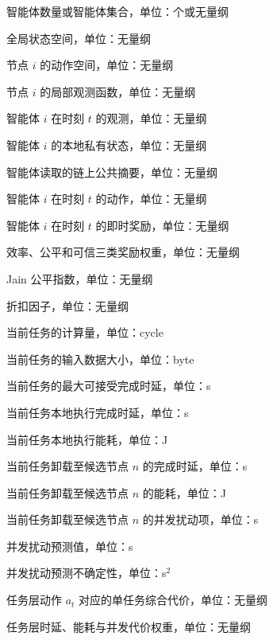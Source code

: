 \begin{symbols}
  \item[$N$] 智能体数量或智能体集合，单位：个或无量纲
  \item[$S$] 全局状态空间，单位：无量纲
  \item[$A^i$] 节点 $i$ 的动作空间，单位：无量纲
  \item[$O^i$] 节点 $i$ 的局部观测函数，单位：无量纲
  \item[$o_t^i$] 智能体 $i$ 在时刻 $t$ 的观测，单位：无量纲
  \item[$l_t^i$] 智能体 $i$ 的本地私有状态，单位：无量纲
  \item[$g_t$] 智能体读取的链上公共摘要，单位：无量纲
  \item[$a_t^i$] 智能体 $i$ 在时刻 $t$ 的动作，单位：无量纲
  \item[$r_t^i$] 智能体 $i$ 在时刻 $t$ 的即时奖励，单位：无量纲
  \item[$w_q,w_f,w_c$] 效率、公平和可信三类奖励权重，单位：无量纲
  \item[$J(t)$] Jain 公平指数，单位：无量纲
  \item[$\gamma$] 折扣因子，单位：无量纲

  \item[$C_i$] 当前任务的计算量，单位：cycle
  \item[$S_i$] 当前任务的输入数据大小，单位：byte
  \item[$D_i$] 当前任务的最大可接受完成时延，单位：s
  \item[$L_i^{\mathrm{loc}}(t)$] 当前任务本地执行完成时延，单位：s
  \item[$E_i^{\mathrm{loc}}(t)$] 当前任务本地执行能耗，单位：J
  \item[$L_i^{\mathrm{off}}(n,t)$] 当前任务卸载至候选节点 $n$ 的完成时延，单位：s
  \item[$E_i^{\mathrm{off}}(n,t)$] 当前任务卸载至候选节点 $n$ 的能耗，单位：J
  \item[$\Delta_i(n,t)$] 当前任务卸载至候选节点 $n$ 的并发扰动项，单位：s
  \item[$\widehat{\Delta}_i(n,t)$] 并发扰动预测值，单位：s
  \item[$\widehat{\sigma}_i^2(n,t)$] 并发扰动预测不确定性，单位：s$^2$
  \item[$J_i(a_t)$] 任务层动作 $a_t$ 对应的单任务综合代价，单位：无量纲
  \item[$\omega_L,\omega_E,\omega_C$] 任务层时延、能耗与并发代价权重，单位：无量纲
\end{symbols}
